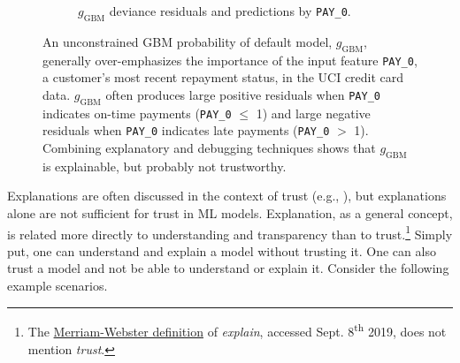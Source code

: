 \documentclass{article}
\begin{document}
\begin{figure}[htb!]
\begin{subfigure}{.5\textwidth}
  		\caption{$g_{\text{GBM}}$ deviance residuals and predictions by \texttt{PAY\_0}.}
  		\label{fig:resid}
	\end{subfigure}
	\caption{An unconstrained GBM probability of default model, $g_{\text{GBM}}$, generally over-emphasizes the importance of the input feature \texttt{PAY\_0}, a customer's most recent repayment status, in the UCI credit card data. $g_{\text{GBM}}$ often produces large positive residuals when \texttt{PAY\_0} indicates on-time payments (\texttt{PAY\_0} $\leq$ 1) and large negative residuals when \texttt{PAY\_0} indicates late payments (\texttt{PAY\_0} $>$ 1). Combining explanatory and debugging techniques shows that $g_{\text{GBM}}$ is explainable, but probably not trustworthy.}
	\label{fig:global_shap_resid}
\end{figure}

Explanations are often discussed in the context of trust (e.g., \citet{lime}), but explanations alone are not sufficient for trust in ML models. Explanation, as a general concept, is related more directly to understanding and transparency than to trust.\footnote{\scriptsize{The \href{https://www.merriam-webster.com/dictionary/explain}{Merriam-Webster definition} of \textit{explain}, accessed Sept. 8\textsuperscript{th} 2019, does not mention \textit{trust}.}} Simply put, one can understand and explain a model without trusting it. One can also trust a model and not be able to understand or explain it. Consider the following example scenarios.
\end{document}
